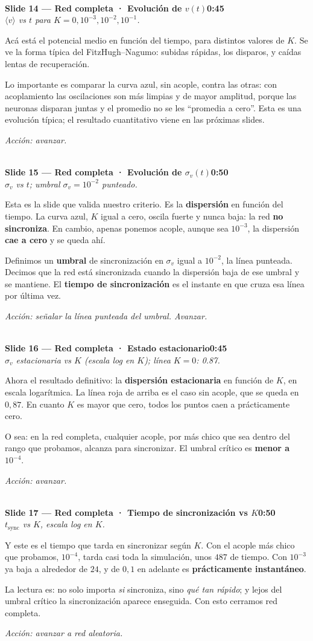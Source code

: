 \documentclass[11pt]{article}
\newcommand{\slide}[3]{%
  \vspace{6pt}%
  \noindent{\color{azulOscuro}\rule{3.2cm}{2pt}}\\[2pt]
  \noindent\textbf{\color{azulOscuro}#1}\hfill\textbf{\color{azulMedio}#3}\\[-2pt]
  {\small\color{grisTexto}\itshape #2}\\[2pt]
}
\begin{document}
\slide{Slide 14 — Red completa · Evolución de $v(t)$}{$\langle v\rangle$ vs $t$ para $K=0,10^{-3},10^{-2},10^{-1}$.}{0:45}
\begin{guion}
Acá está el potencial medio en función del tiempo, para distintos valores de $K$. Se ve la forma típica del FitzHugh--Nagumo: subidas rápidas, los disparos, y caídas lentas de recuperación.

Lo importante es comparar la curva azul, sin acople, contra las otras: con acoplamiento las oscilaciones son más limpias y de mayor amplitud, porque las neuronas disparan juntas y el promedio no se les ``promedia a cero''. Esta es una evolución típica; el resultado cuantitativo viene en las próximas slides.
\end{guion}
\textit{Acción: avanzar.}

\slide{Slide 15 — Red completa · Evolución de $\sigma_v(t)$}{$\sigma_v$ vs $t$; umbral $\sigma_v=10^{-2}$ punteado.}{0:50}
\begin{guion}
Esta es la slide que valida nuestro criterio. Es la \textbf{dispersión} en función del tiempo. La curva azul, $K$ igual a cero, oscila fuerte y nunca baja: la red \textbf{no sincroniza}. En cambio, apenas ponemos acople, aunque sea $10^{-3}$, la dispersión \textbf{cae a cero} y se queda ahí.

Definimos un \textbf{umbral} de sincronización en $\sigma_v$ igual a $10^{-2}$, la línea punteada. Decimos que la red está sincronizada cuando la dispersión baja de ese umbral y se mantiene. El \textbf{tiempo de sincronización} es el instante en que cruza esa línea por última vez.
\end{guion}
\textit{Acción: señalar la línea punteada del umbral. Avanzar.}

\slide{Slide 16 — Red completa · Estado estacionario}{$\sigma_v$ estacionaria vs $K$ (escala log en $K$); línea $K=0$: 0.87.}{0:45}
\begin{guion}
Ahora el resultado definitivo: la \textbf{dispersión estacionaria} en función de $K$, en escala logarítmica. La línea roja de arriba es el caso sin acople, que se queda en $0{,}87$. En cuanto $K$ es mayor que cero, todos los puntos caen a prácticamente cero.

O sea: en la red completa, cualquier acople, por más chico que sea dentro del rango que probamos, alcanza para sincronizar. El umbral crítico es \textbf{menor a $10^{-4}$}.
\end{guion}
\textit{Acción: avanzar.}

\slide{Slide 17 — Red completa · Tiempo de sincronización vs $K$}{$t_{\text{sync}}$ vs $K$, escala log en $K$.}{0:50}
\begin{guion}
Y este es el tiempo que tarda en sincronizar según $K$. Con el acople más chico que probamos, $10^{-4}$, tarda casi toda la simulación, unos $487$ de tiempo. Con $10^{-3}$ ya baja a alrededor de $24$, y de $0{,}1$ en adelante es \textbf{prácticamente instantáneo}.

La lectura es: no solo importa \textit{si} sincroniza, sino \textit{qué tan rápido}; y lejos del umbral crítico la sincronización aparece enseguida. Con esto cerramos red completa.
\end{guion}
\textit{Acción: avanzar a red aleatoria.}
\end{document}
